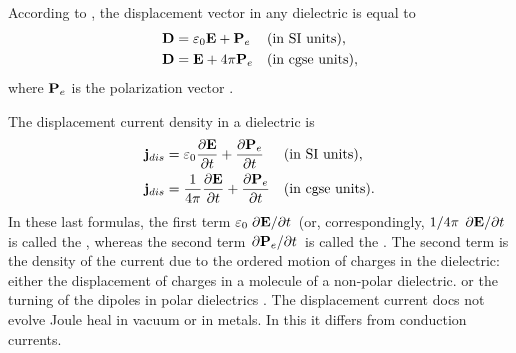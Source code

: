 \subsection{}\label{27.3.3} According to , the displacement vector in any dielectric is equal to
\begin{align*}%
\vb{D} & = \varepsilon_{0}\vb{E} + \vb{P}_{e} && \text{(in SI units),} \\
\vb{D} & = \vb{E} + 4 \pi \vb{P}_{e}  && \text{(in cgse units)},
\end{align*}
where $\vb{P}_{e}$ is the polarization vector .

The displacement current density in a dielectric is
\begin{align*}%
\vb{j}_{dis} & = \varepsilon_{0} \pdv{\vb{E}}{t}+ \pdv{\vb{P}_{e}}{t}  && \text{(in SI units),} \\
\vb{j}_{dis} & = \frac{1}{4\pi} \pdv{\vb{E}}{t}+ \pdv{\vb{P}_{e}}{t}  && \text{(in cgse units).}
\end{align*}
In these last formulas, the first term $\varepsilon_{0} \pdv*{\vb{E}}{t}$ (or, correspondingly, $1/4\pi \, \pdv*{\vb{E}}{t}$ is called the ,
whereas the second term $\pdv*{\vb{P}_{e}}{t} $ is called the . The second term is the density of the current due to the ordered motion of charges in the dielectric: either the displacement of charges in a molecule of a non-polar dielectric.  or the turning of the dipoles in polar dielectrics . The displacement current docs not evolve Joule heal  in vacuum or in metals. In this it differs from conduction currents.

